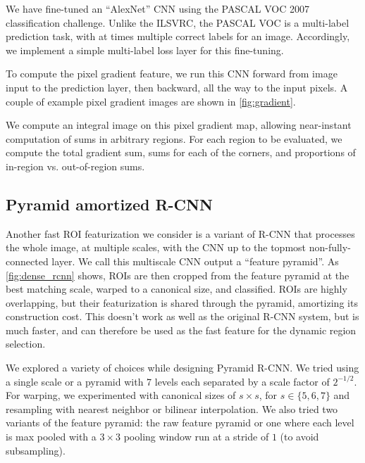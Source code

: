 We have fine-tuned an ``AlexNet'' \cite{Krizhevsky-NIPS-2012} CNN using the PASCAL VOC 2007 classification challenge.
Unlike the ILSVRC, the PASCAL VOC is a multi-label prediction task, with at times multiple correct labels for an image.
Accordingly, we implement a simple multi-label loss layer for this fine-tuning.

To compute the pixel gradient feature, we run this CNN forward from image input to the prediction layer, then backward, all the way to the input pixels.
A couple of example pixel gradient images are shown in \autoref{fig:gradient}.

We compute an integral image on this pixel gradient map, allowing near-instant computation of sums in arbitrary regions.
For each region to be evaluated, we compute the total gradient sum, sums for each of the corners, and proportions of in-region vs. out-of-region sums.


\subsection{Pyramid amortized R-CNN}\label{sec:dense}

Another fast ROI featurization we consider is a variant of R-CNN that processes the whole image, at multiple scales, with the CNN up to the topmost non-fully-connected layer.
We call this multiscale CNN output a ``feature pyramid''.
As \autoref{fig:dense_rcnn} shows, ROIs are then cropped from the feature pyramid at the best matching scale, warped to a canonical size, and classified.
ROIs are highly overlapping, but their featurization is shared through the pyramid, amortizing its construction cost.
This doesn't work as well as the original R-CNN system, but is much faster, and can therefore be used as the fast feature for the dynamic region selection.


We explored a variety of choices while designing Pyramid R-CNN.
We tried using a single scale or a pyramid with 7 levels each separated by a scale factor of $2^{-1/2}$.
For warping, we experimented with canonical sizes of $s \times s$, for $s \in \{5,6,7\}$ and resampling with nearest neighbor or bilinear interpolation.
We also tried two variants of the feature pyramid: the raw feature pyramid or one where each level is max pooled with a $3 \times 3$ pooling window run at a stride of $1$ (to avoid subsampling).

